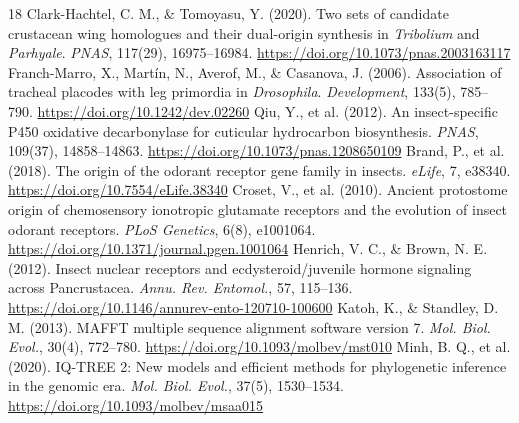 \documentclass[10pt,letterpaper]{article}
\begin{document}
\begin{thebibliography}{18}
 Clark-Hachtel, C. M., \& Tomoyasu, Y. (2020). Two sets of candidate crustacean wing homologues and their dual-origin synthesis in \textit{Tribolium} and \textit{Parhyale}. \textit{PNAS}, 117(29), 16975--16984. \url{https://doi.org/10.1073/pnas.2003163117}
 Franch-Marro, X., Mart\'{i}n, N., Averof, M., \& Casanova, J. (2006). Association of tracheal placodes with leg primordia in \textit{Drosophila}. \textit{Development}, 133(5), 785--790. \url{https://doi.org/10.1242/dev.02260}
 Qiu, Y., et al. (2012). An insect-specific P450 oxidative decarbonylase for cuticular hydrocarbon biosynthesis. \textit{PNAS}, 109(37), 14858--14863. \url{https://doi.org/10.1073/pnas.1208650109}
 Brand, P., et al. (2018). The origin of the odorant receptor gene family in insects. \textit{eLife}, 7, e38340. \url{https://doi.org/10.7554/eLife.38340}
 Croset, V., et al. (2010). Ancient protostome origin of chemosensory ionotropic glutamate receptors and the evolution of insect odorant receptors. \textit{PLoS Genetics}, 6(8), e1001064. \url{https://doi.org/10.1371/journal.pgen.1001064}
 Henrich, V. C., \& Brown, N. E. (2012). Insect nuclear receptors and ecdysteroid/juvenile hormone signaling across Pancrustacea. \textit{Annu. Rev. Entomol.}, 57, 115--136. \url{https://doi.org/10.1146/annurev-ento-120710-100600}
 Katoh, K., \& Standley, D. M. (2013). MAFFT multiple sequence alignment software version 7. \textit{Mol. Biol. Evol.}, 30(4), 772--780. \url{https://doi.org/10.1093/molbev/mst010}
 Minh, B. Q., et al. (2020). IQ-TREE 2: New models and efficient methods for phylogenetic inference in the genomic era. \textit{Mol. Biol. Evol.}, 37(5), 1530--1534. \url{https://doi.org/10.1093/molbev/msaa015}
\end{thebibliography}
\end{document}
